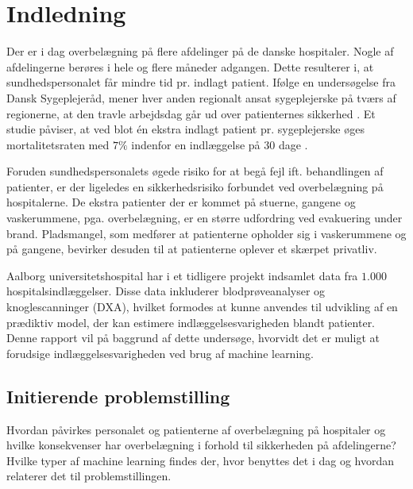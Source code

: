 \chapter{Indledning}
Der er i dag overbelægning på flere afdelinger på de danske hospitaler. Nogle af afdelingerne berøres i hele og flere måneder adgangen. \cite{2015} Dette resulterer i, at sundhedspersonalet får mindre tid pr. indlagt patient. Ifølge en undersøgelse fra Dansk Sygeplejeråd, mener hver anden regionalt ansat sygeplejerske på tværs af regionerne, at den travle arbejdsdag går ud over patienternes sikkerhed \cite{Kjeldsen2015}. Et studie påviser, at ved blot én ekstra indlagt patient pr. sygeplejerske øges mortalitetsraten med $7 \%$ indenfor en indlæggelse på 30 dage  \cite{Aiken2014}. 

Foruden sundhedspersonalets øgede risiko for at begå fejl ift. behandlingen af patienter, er der ligeledes en sikkerhedsrisiko forbundet ved overbelægning på hospitalerne. De ekstra patienter der er kommet på stuerne, gangene og vaskerummene, pga. overbelægning, er en større udfordring ved evakuering under brand. Pladsmangel, som medfører at patienterne opholder sig i vaskerummene og på gangene, bevirker desuden til at patienterne oplever et skærpet privatliv. \cite{Madsen2014}

Aalborg universitetshospital har i et tidligere projekt indsamlet data fra $1.000$ hospitalsindlæggelser. Disse data inkluderer blodprøveanalyser og knoglescanninger (DXA), hvilket formodes at kunne anvendes til udvikling af en prædiktiv model, der kan estimere indlæggelsesvarigheden blandt patienter. Denne rapport vil på baggrund af dette undersøge, hvorvidt det er muligt at forudsige indlæggelsesvarigheden ved brug af machine learning. 



\section{Initierende problemstilling}
Hvordan påvirkes personalet og patienterne af overbelægning på hospitaler og hvilke konsekvenser har overbelægning i forhold til sikkerheden på afdelingerne?
Hvilke typer af machine learning findes der, hvor benyttes det i dag og hvordan relaterer det til problemstillingen.

